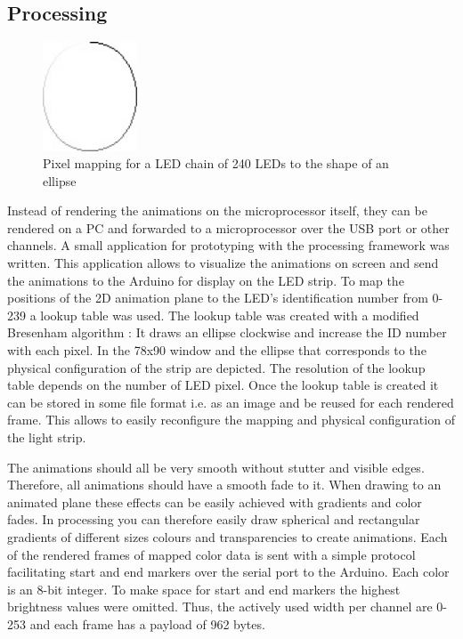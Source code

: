 \subsection{Processing}
\label{ssec:processing}
\begin{figure}
    \includegraphics[width=0.25\textwidth]{fig/240id}
    \caption[Pixel Mapping]{Pixel mapping for a LED chain of 240 LEDs to the shape of an ellipse}
    \label{fig:Pixel}
\end{figure}
Instead of rendering the animations on the microprocessor itself, they can be rendered on a PC and forwarded to a microprocessor over the USB port or other channels. 
A small application for prototyping with the processing framework was written. This application allows to visualize the animations on screen and send the animations to the Arduino for display on the LED strip. To map the positions of the 2D animation plane to the LED's identification number from 0-239 a lookup table was used. The lookup table was created with a modified Bresenham algorithm \citep{Raheja2006MidpointAlgorithm}: It draws an ellipse clockwise and increase the ID number with each pixel. In \emph{} the 78x90 window and the ellipse that corresponds to the physical configuration of the strip are depicted. The resolution of the lookup table depends on the number of LED pixel. Once the lookup table is created it can be stored in some file format i.e. as an image and be reused for each rendered frame. This allows to easily reconfigure the mapping and physical configuration of the light strip. 

The animations should all be very smooth without stutter and visible edges. Therefore, all animations should have a smooth fade to it. When drawing to an animated plane these effects can be easily achieved with gradients and color fades. In processing you can therefore easily draw spherical and rectangular gradients of different sizes colours and transparencies to create animations. Each of the rendered frames of  mapped color data is sent with a simple protocol  facilitating start and end markers over the serial port to the Arduino. Each color is an 8-bit integer. To make space for start and end markers the highest brightness values were omitted. Thus, the actively used width per channel are 0-253 and each frame has a payload of 962 bytes. 


